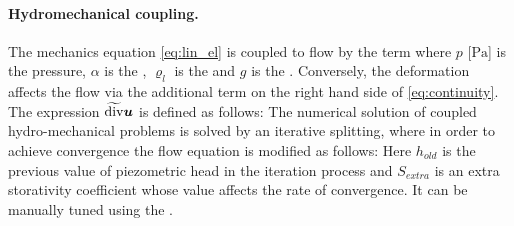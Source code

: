 \paragraph{Hydromechanical coupling.}
The mechanics equation \eqref{eq:lin_el} is coupled to flow by the term
where $p$ [$\mathrm{Pa}$] is the pressure, $\alpha$ \units{}{}{} is the , $\varrho_l$  is the  and $g$  is the .
Conversely, the deformation affects the flow via the additional term
on the right hand side of \eqref{eq:continuity}.
The expression $\widetilde{\operatorname{div}}\mathbf{\boldsymbol{u}}$ is defined as follows:
The numerical solution of coupled hydro-mechanical problems is solved by an iterative splitting, where in order to achieve convergence the flow equation is modified as follows:
Here $h_{old}$ is the previous value of piezometric head in the iteration process and $S_{extra}$ is an extra storativity coefficient whose value affects the rate of convergence.
It can be manually tuned using the .


